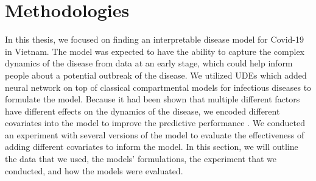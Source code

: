 \chapter{Methodologies}
\label{chap:methodologies}

In this thesis, we focused on finding an interpretable disease model for Covid-19 in Vietnam.
The model was expected to have the ability to capture the complex dynamics of the disease from data at an early stage, which could help inform people about a potential outbreak of the disease.
We utilized \glspl{UDE} which added neural network on top of classical compartmental models for infectious diseases to formulate the model.
Because it had been shown that multiple different factors have different effects on the dynamics of the disease, we encoded different covariates into the model to improve the predictive performance \cite{ihmecovid-19forecastingteamModelingCOVID19Scenarios2021,arikInterpretableSequenceLearning}.
We conducted an experiment with several versions of the model to evaluate the effectiveness of adding different covariates to inform the model.
In this section, we will outline the data that we used, the models' formulations, the experiment that we conducted, and how the models were evaluated.











